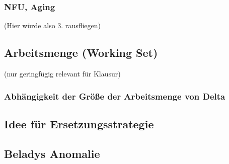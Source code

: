 \subsubsection{NFU, Aging}
(Hier würde also 3. rausfliegen)
\subsection{Arbeitsmenge (Working Set)}
(nur geringfügig relevant für Klausur)
\subsubsection{Abhängigkeit der Größe der Arbeitsmenge von Delta}
\subsection{Idee für Ersetzungsstrategie}

\subsection{Beladys Anomalie}




